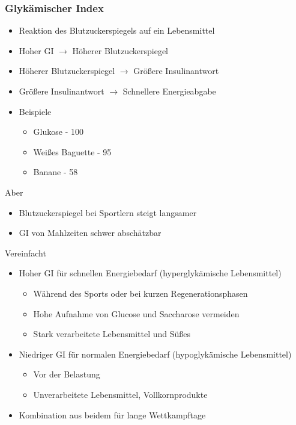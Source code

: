 \documentclass[ngerman, aspectratio=169]{beamer}
\begin{document}
\begin{frame}[allowframebreaks]
  \frametitle{Glykämischer Index}
  \begin{itemize}
  \item Reaktion des Blutzuckerspiegels auf ein Lebensmittel
  \item Hoher GI $→$ Höherer Blutzuckerspiegel
  \item Höherer Blutzuckerspiegel $→$ Größere Insulinantwort
  \item Größere Insulinantwort $→$ Schnellere Energieabgabe
  \item Beispiele
    \begin{itemize}
    \item Glukose - 100
    \item Weißes Baguette - 95
    \item Banane - 58
    \end{itemize}

  \end{itemize}

  Aber

  \begin{itemize}
  \item Blutzuckerspiegel bei Sportlern steigt langsamer
  \item GI von Mahlzeiten schwer abschätzbar
  \end{itemize}
  
  \framebreak

  Vereinfacht

  \begin{itemize}
  \item Hoher GI für schnellen Energiebedarf (hyperglykämische Lebensmittel)
    \begin{itemize}
    \item Während des Sports oder bei kurzen Regenerationsphasen
    \item Hohe Aufnahme von Glucose und Saccharose vermeiden
    \item Stark verarbeitete Lebensmittel und Süßes
    \end{itemize}

  \item Niedriger GI für normalen Energiebedarf (hypoglykämische Lebensmittel)
    \begin{itemize}
    \item Vor der Belastung
    \item Unverarbeitete Lebensmittel, Vollkornprodukte
    \end{itemize}

  \item Kombination aus beidem für lange Wettkampftage

  \end{itemize}
  
\end{frame}
\end{document}
